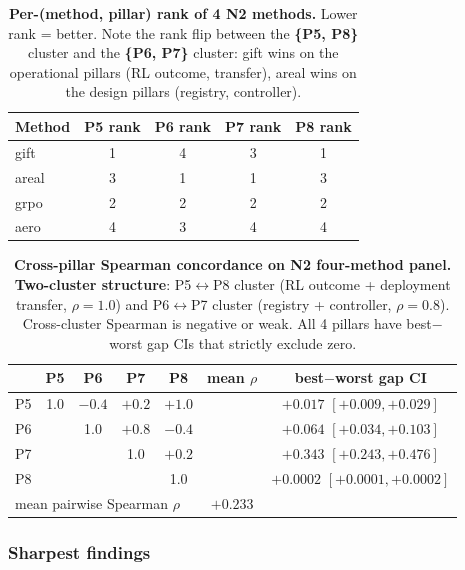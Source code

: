 \begin{table}[h]
\centering
\small
\begin{tabular}{lcccc}
\hline
Method & P5 rank & P6 rank & P7 rank & P8 rank \\
\hline
gift   & 1 & 4 & 3 & 1 \\
areal  & 3 & 1 & 1 & 3 \\
grpo   & 2 & 2 & 2 & 2 \\
aero   & 4 & 3 & 4 & 4 \\
\hline
\end{tabular}
\caption{\textbf{Per-(method, pillar) rank of 4 N2 methods.} Lower rank = better.
Note the rank flip between the \textbf{\{P5, P8\}} cluster and the
\textbf{\{P6, P7\}} cluster: gift wins on the operational pillars (RL
outcome, transfer), areal wins on the design pillars (registry, controller).}
\label{tab:synth-d20-ranks}
\end{table}

\begin{table}[h]
\centering
\small
\begin{tabular}{lcccccc}
\hline
 & P5 & P6 & P7 & P8 & mean $\rho$ & best$-$worst gap CI \\
\hline
P5 & 1.0 & $-0.4$ & $+0.2$ & $\mathbf{+1.0}$ & & $+0.017$ $[+0.009, +0.029]$ \\
P6 &      &  1.0   & $\mathbf{+0.8}$ & $-0.4$ & & $+0.064$ $[+0.034, +0.103]$ \\
P7 &      &        &  1.0   & $+0.2$ & & $+0.343$ $[+0.243, +0.476]$ \\
P8 &      &        &        &  1.0   & & $+0.0002$ $[+0.0001, +0.0002]$ \\
\hline
\multicolumn{5}{l}{mean pairwise Spearman $\rho$} & $+0.233$ & \\
\hline
\end{tabular}
\caption{\textbf{Cross-pillar Spearman concordance on N2 four-method panel.}
\textbf{Two-cluster structure}: P5$\leftrightarrow$P8 cluster (RL outcome +
deployment transfer, $\rho{=}1.0$) and P6$\leftrightarrow$P7 cluster
(registry + controller, $\rho{=}0.8$). Cross-cluster Spearman is negative
or weak. All 4 pillars have best$-$worst gap CIs that strictly exclude zero.}
\label{tab:synth-d20-concordance}
\end{table}

\subsubsection{Sharpest findings}\label{sec:synth-iter192-d20-findings}

